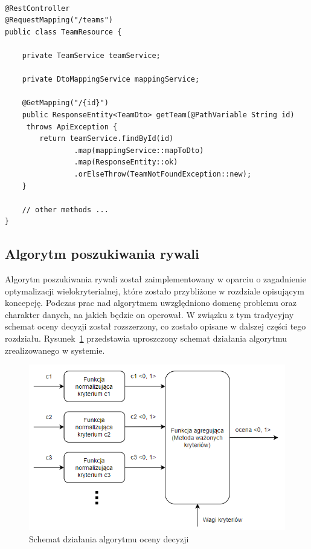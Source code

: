 \begin{minipage}{\linewidth}
\begin{lstlisting}[label=list:resource, caption=Fragment kontrolera TeamResource, basicstyle=\footnotesize\ttfamily]

@RestController
@RequestMapping("/teams")
public class TeamResource {

    private TeamService teamService;

    private DtoMappingService mappingService;

    @GetMapping("/{id}")
    public ResponseEntity<TeamDto> getTeam(@PathVariable String id)
     throws ApiException {
        return teamService.findById(id)
                .map(mappingService::mapToDto)
                .map(ResponseEntity::ok)
                .orElseThrow(TeamNotFoundException::new);
    }
    
    // other methods ...
}

\end{lstlisting}
\end{minipage}


\subsection{Algorytm poszukiwania rywali}

Algorytm poszukiwania rywali został zaimplementowany w oparciu o zagadnienie optymalizacji wielokryterialnej, które zostało przybliżone w rozdziale opisującym koncepcję. Podczas prac nad algorytmem uwzględniono domenę problemu oraz charakter danych, na jakich będzie on operował. W związku z tym tradycyjny schemat oceny decyzji został rozszerzony, co zostało opisane w dalszej części tego rozdziału. Rysunek~\ref{fig:diagram-alg-ext} przedstawia uproszczony schemat działania algorytmu zrealizowanego w systemie.

\begin{figure}[H]
\centering
\includegraphics[width=0.8\linewidth]{03-koncept/rys/algorytm.PNG}
\caption{Schemat działania algorytmu oceny decyzji}
\label{fig:diagram-alg-ext}
\end{figure}

